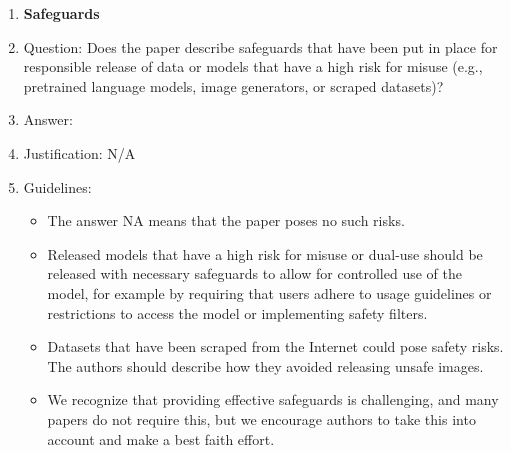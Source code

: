 \documentclass{article}
\begin{document}
\begin{enumerate}
\item {\bf Safeguards}
    \item[] Question: Does the paper describe safeguards that have been put in place for responsible release of data or models that have a high risk for misuse (e.g., pretrained language models, image generators, or scraped datasets)?
    \item[] Answer: \answerNA{} %
    \item[] Justification: N/A
    \item[] Guidelines:
    \begin{itemize}
        \item The answer NA means that the paper poses no such risks.
        \item Released models that have a high risk for misuse or dual-use should be released with necessary safeguards to allow for controlled use of the model, for example by requiring that users adhere to usage guidelines or restrictions to access the model or implementing safety filters. 
        \item Datasets that have been scraped from the Internet could pose safety risks. The authors should describe how they avoided releasing unsafe images.
        \item We recognize that providing effective safeguards is challenging, and many papers do not require this, but we encourage authors to take this into account and make a best faith effort.
    \end{itemize}


\end{enumerate}
\end{document}
